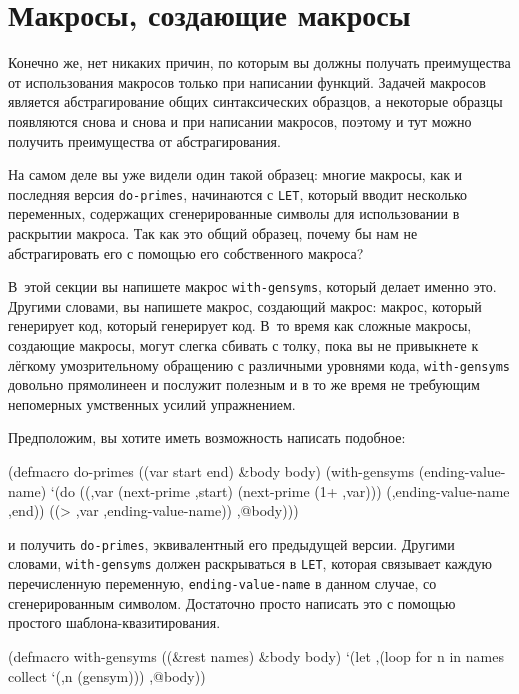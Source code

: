 \section{Макросы, создающие макросы}

Конечно же, нет никаких причин, по которым вы должны получать преимущества от
использования макросов только при написании функций. Задачей макросов является
абстрагирование общих синтаксических образцов, а некоторые образцы появляются снова и
снова и при написании макросов, поэтому и тут можно получить преимущества от
абстрагирования.

На самом деле вы уже видели один такой образец: многие макросы, как и последняя версия
\lstinline{do-primes}, начинаются с \lstinline{LET}, который вводит несколько переменных,
содержащих сгенерированные символы для использовании в раскрытии макроса. Так как это
общий образец, почему бы нам не абстрагировать его с помощью его собственного макроса?

В~этой секции вы напишете макрос \lstinline{with-gensyms}, который делает именно это. Другими
словами, вы напишете макрос, создающий макрос: макрос, который генерирует код, который
генерирует код. В~то время как сложные макросы, создающие макросы, могут слегка сбивать с
толку, пока вы не привыкнете к лёгкому умозрительному обращению с различными уровнями
кода, \lstinline{with-gensyms} довольно прямолинеен и послужит полезным и в то же время не
требующим непомерных умственных усилий упражнением.

Предположим, вы хотите иметь возможность написать подобное:

\begin{myverb}
(defmacro do-primes ((var start end) &body body)
  (with-gensyms (ending-value-name)
    `(do ((,var (next-prime ,start) (next-prime (1+ ,var)))
          (,ending-value-name ,end))
         ((> ,var ,ending-value-name))
       ,@body)))
\end{myverb}

\noindent{}и получить \lstinline{do-primes}, эквивалентный его предыдущей версии. Другими словами,
\lstinline{with-gensyms} должен раскрываться в \lstinline{LET}, которая связывает каждую
перечисленную переменную, \lstinline{ending-value-name} в данном случае, со сгенерированным
символом. Достаточно просто написать это с помощью простого шаблона-квазитирования.

\begin{myverb}
(defmacro with-gensyms ((&rest names) &body body)
  `(let ,(loop for n in names collect `(,n (gensym)))
     ,@body))
\end{myverb}

